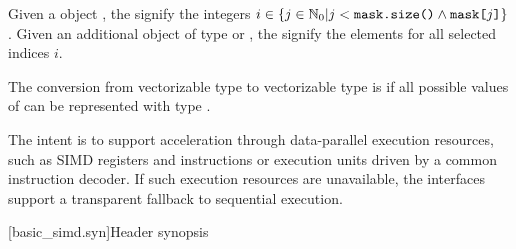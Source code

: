 \pnum
Given a  object ,
the  signify the integers $i \in \{j \in \mathbb{N}_0 | j < \texttt{mask.size()} \wedge \texttt{mask[}j\texttt{]}\}$.
Given an additional object  of type  or ,
the  signify the elements  for all selected indices $i$.

\pnum
The conversion from vectorizable type  to vectorizable type  is  if
all possible values of  can be represented with type .

\pnum
\begin{note}
The intent is to support acceleration through data-parallel execution resources, such as SIMD registers and instructions or execution units driven by a common instruction decoder. If such execution resources are unavailable, the interfaces support a transparent fallback to sequential execution.
\end{note}

[basic_simd.syn]{Header \texorpdfstring{}{<basic_simd>} synopsis}

\newcommand\nativeabi{\UNSP{native-abi}}
\newcommand\deducet{\UNSP{deduce-t}}
\newcommand\simdsizetype{\UNSP{simd-size-type}}

